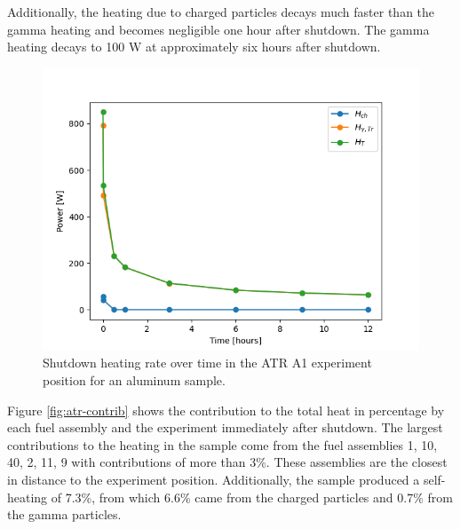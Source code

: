 \documentclass{style/nseJournal}
\begin{document}
Additionally, the heating due to charged particles decays much faster than the gamma heating and becomes negligible one hour after shutdown.
The gamma heating decays to 100 W at approximately six hours after shutdown.

\begin{figure}[htbp!] %
    \centering
    \includegraphics[width=0.90\linewidth]{figures/atr_decay_heat_time}
    \hfill
    \caption{Shutdown heating rate over time in the ATR A1 experiment position for an aluminum sample.}
    \label{fig:atr-time}
\end{figure}

Figure \ref{fig:atr-contrib} shows the contribution to the total heat in percentage by each fuel assembly and the experiment immediately after shutdown.
The largest contributions to the heating in the sample come from the fuel assemblies 1, 10, 40, 2, 11, 9 with contributions of more than 3\%.
These assemblies are the closest in distance to the experiment position.
Additionally, the sample produced a self-heating of 7.3\%, from which 6.6\% came from the charged particles and 0.7\% from the gamma particles.

\end{document}

